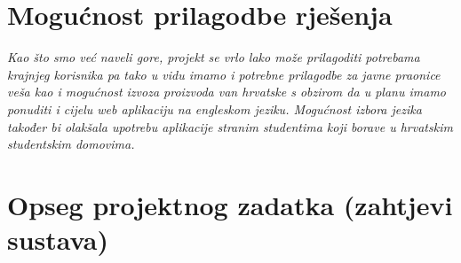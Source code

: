 		\section{Mogućnost prilagodbe rješenja}
			
			\textit{Kao što smo već naveli gore, projekt se vrlo lako može prilagoditi potrebama krajnjeg korisnika pa tako u
			vidu imamo i potrebne prilagodbe za javne praonice veša kao i mogućnost izvoza proizvoda van hrvatske
			s obzirom da u planu imamo ponuditi i cijelu web aplikaciju na engleskom jeziku. Mogućnost izbora
			jezika također bi olakšala upotrebu aplikacije stranim studentima koji borave u hrvatskim studentskim
			domovima.}
			
		\section{Opseg projektnog zadatka (zahtjevi sustava)}
		
